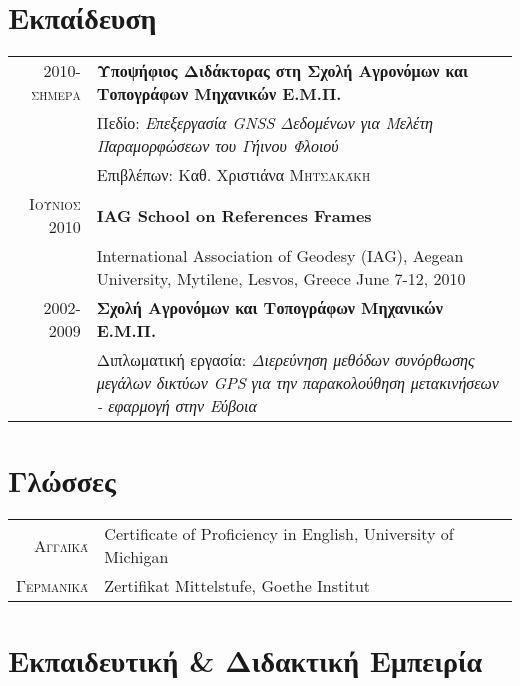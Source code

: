 \documentclass[a4paper,10pt]{article} %
\begin{document}
\section{Εκπαίδευση}
\begin{tabular}{rp{13cm}}

  \textsc{2010-σήμερα} &\textbf{Υποψήφιος Διδάκτορας στη Σχολή Αγρονόμων και Τοπογράφων Μηχανικών Ε.Μ.Π.}\\
   & Πεδίο: \textit{Επεξεργασία GNSS Δεδομένων για Μελέτη Παραμορφώσεων του Γήινου Φλοιού}\\
   & \small Επιβλέπων: Καθ. Χριστιάνα \textsc{Μητσακάκη}\\

  \textsc{Ιούνιος 2010} & \textbf{IAG School on References Frames}\\
    & International Association of Geodesy \small{(IAG)}, Aegean University, Mytilene, Lesvos, Greece June 7-12, 2010\\

  \textsc{2002-2009} & \textbf{Σχολή Αγρονόμων και Τοπογράφων Μηχανικών Ε.Μ.Π.}\\
  & Διπλωματική εργασία: 
  \textit{Διερεύνηση μεθόδων συνόρθωσης μεγάλων δικτύων GPS για την παρακολούθηση μετακινήσεων - εφαρμογή στην Εύβοια}\\

\end{tabular}
\medskip

\section{Γλώσσες}
\begin{tabular}{rp{13cm}}

\textsc{Αγγλικά} & Certificate of Proficiency in English, University of Michigan \\
\textsc{Γερμανικά} & Zertifikat Mittelstufe, Goethe Institut\\

\end{tabular}
\medskip

\section{Εκπαιδευτική \& Διδακτική Εμπειρία}
\end{document}
